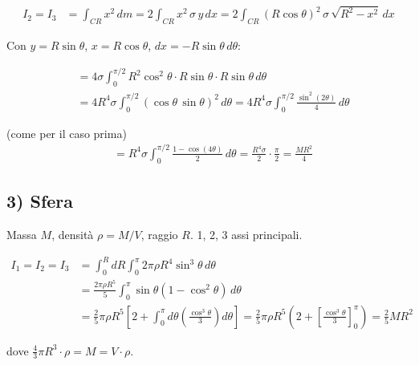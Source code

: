 \begin{align*}
\boxed{I_2 = I_3} &= \int_{CR} x^2\,dm = 2\int_{CR} x^2\,\sigma\,y\,dx = 2\int_{CR} (R\cos\theta)^2\,\sigma\,\sqrt{R^2 - x^2}\,dx
\end{align*}

Con $y = R\sin\theta$, $x = R\cos\theta$, $dx = -R\sin\theta\,d\theta$:

\begin{align*}
&= 4\sigma\int_0^{\pi/2} R^2\cos^2\theta \cdot R\sin\theta \cdot R\sin\theta\,d\theta \\
&= 4R^4\sigma\int_0^{\pi/2}(\cos\theta\,\sin\theta)^2\,d\theta = 4R^4\sigma\int_0^{\pi/2}\frac{\sin^2(2\theta)}{4}\,d\theta
\end{align*}

(come per il caso prima)
\begin{align*}
&= R^4\sigma \int_0^{\pi/2}\frac{1-\cos(4\theta)}{2}\,d\theta = \frac{R^4\sigma}{2}\cdot\frac{\pi}{2} = \boxed{\frac{MR^2}{4}}
\end{align*}

\subsection{3) Sfera}

Massa $M$, densità $\rho = M/V$, raggio $R$. 1, 2, 3 assi principali.


\begin{align*}
\boxed{I_1 = I_2 = I_3} &= \int_0^R dR \int_0^{\pi} 2\pi\rho R^4 \sin^3\theta\,d\theta \\
&= \frac{2\pi\rho R^5}{5}\int_0^{\pi}\sin\theta(1-\cos^2\theta)\,d\theta \\
&= \frac{2}{5}\pi\rho R^5\left[2 + \int_0^{\pi} d\theta\left(\frac{\cos^3\theta}{3}\right)d\theta\right] = \frac{2}{5}\pi\rho R^5\left(2 + \left[\frac{\cos^3\theta}{3}\right]_0^{\pi}\right) = \boxed{\frac{2}{5}MR^2}
\end{align*}

dove $\frac{4}{3}\pi R^3 \cdot \rho = M = V \cdot \rho$.
